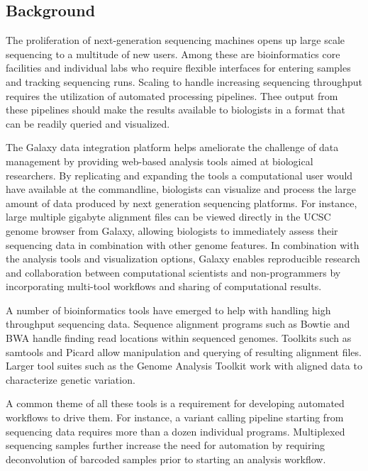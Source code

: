 \documentclass[10pt]{bmc_article}
\newenvironment{bmcformat}{\begin{raggedright}\baselineskip20pt\sloppy\setboolean{publ}{false}}{\end{raggedright}\baselineskip20pt\sloppy}
\begin{document}
\begin{bmcformat}

\section*{Background}

The proliferation of next-generation sequencing machines opens up
large scale sequencing to a multitude of new users. Among these are
bioinformatics core facilities and individual labs who require
flexible interfaces for entering samples and tracking sequencing runs.
Scaling to handle increasing sequencing throughput requires the
utilization of automated processing pipelines. Thee output from these
pipelines should make the results available to biologists in a format
that can be readily queried and visualized.

The Galaxy data integration platform \cite{goecks_galaxy:_2010} helps
ameliorate the challenge of data management by providing web-based
analysis tools aimed at biological researchers. By replicating and
expanding the tools a computational user would have available at the
commandline, biologists can visualize and process the large amount of
data produced by next generation sequencing platforms. For instance,
large multiple gigabyte alignment files can be viewed directly in the
UCSC genome browser \cite{fujita_ucsc_2011} from Galaxy, allowing
biologists to immediately assess their sequencing data in combination
with other genome features. In combination with the analysis tools and
visualization options, Galaxy enables reproducible research and
collaboration between computational scientists and non-programmers by
incorporating multi-tool workflows and sharing of computational results.

A number of bioinformatics tools have emerged to help with handling
high throughput sequencing data. Sequence alignment programs such as
Bowtie \cite{langmead_ultrafast_2009} and BWA \cite{li_fast_2009}
handle finding read locations within sequenced genomes. Toolkits such
as samtools \cite{li_sequence_2009} and Picard \cite{_picard_????}
allow manipulation and querying of resulting alignment files. Larger
tool suites such as the Genome Analysis Toolkit
\cite{mckenna_genome_2010} work with aligned data to characterize
genetic variation.

A common theme of all these tools is a requirement for developing
automated workflows to drive them. For instance, a variant calling
pipeline starting from sequencing data requires more than a dozen
individual programs. Multiplexed sequencing samples further increase
the need for automation by requiring deconvolution of barcoded samples
prior to starting an analysis workflow.


\end{bmcformat}
\end{document}
